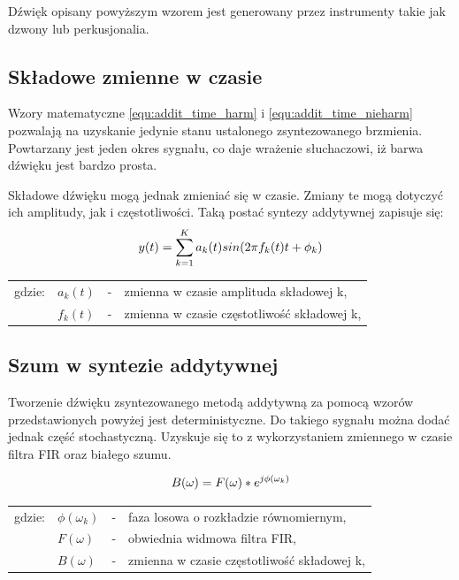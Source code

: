 Dźwięk opisany powyższym wzorem jest generowany przez instrumenty takie jak dzwony lub perkusjonalia.

\subsection{Składowe zmienne w czasie}
Wzory matematyczne \ref{equ:addit_time_harm} i \ref{equ:addit_time_nieharm} pozwalają na uzyskanie jedynie stanu ustalonego zsyntezowanego brzmienia. Powtarzany jest jeden okres sygnału, co daje wrażenie słuchaczowi, iż barwa dźwięku jest bardzo prosta.

Składowe dźwięku mogą jednak zmieniać się w czasie. Zmiany te mogą dotyczyć ich amplitudy, jak i częstotliwości.
Taką postać syntezy addytywnej zapisuje się:
\begin{equation} \label{equ:addit_time_zmienne}
y(t) = \sum_{k=1}^{K} a_{k}(t)sin(2\pi f_{k}(t)t + \phi_{k})  \\  
\end{equation}
\begin{tabular}{ l l l l}
	gdzie: & $a_{k}(t)$ &  - & zmienna w czasie amplituda składowej k, \\
	&	$f_{k}(t)$ & - &  zmienna w czasie częstotliwość składowej k, \\
\end{tabular}

\subsection{Szum w syntezie addytywnej}
Tworzenie dźwięku zsyntezowanego metodą addytywną za pomocą wzorów przedstawionych powyżej jest deterministyczne. Do takiego sygnału można dodać jednak część stochastyczną. Uzyskuje się to z wykorzystaniem zmiennego w czasie filtra FIR oraz białego szumu.

\begin{equation} \label{equ:addit_szum}
B(\omega) = F(\omega)*e^{j\phi(\omega_{k})} \\  
\end{equation}
\begin{tabular}{ l l l l}
	gdzie: & $\phi(\omega_{k})$ &  - & faza losowa o rozkładzie równomiernym, \\
	& $F(\omega)$ &  - & obwiednia widmowa filtra FIR, \\
	&	$B(\omega)$ & - & zmienna w czasie częstotliwość składowej k, \\
\end{tabular}

